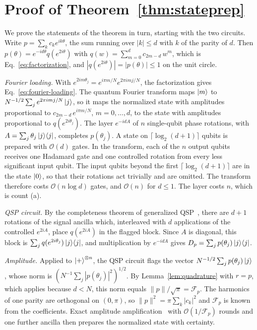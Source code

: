 \section{Proof of Theorem~\ref{thm:stateprep}}
\label{app:filling}
\label{app:stateprep}

We prove the statements of the theorem in turn, starting with the
two circuits.  Write $p=\sum_k c_k e^{ik\theta}$, the sum running
over $|k|\le d$ with $k$ of the parity of $d$.  Then
$p(\theta)=e^{-id\theta}q(e^{2i\theta})$ with
$q(w)=\sum_{m=0}^{d}c_{2m-d}\,w^m$, which is
Eq.~\eqref{eq:factorization}, and
$|q(e^{2i\theta})|=|p(\theta)|\le1$ on the unit circle.

\emph{Fourier loading.}  With
$e^{2im\theta_j}=e^{i\pi m/N}e^{2\pi imj/N}$, the
factorization gives Eq.~\eqref{eq:fourier-loading}.  The quantum
Fourier transform maps $\ket{m}$ to
$N^{-1/2}\sum_je^{2\pi imj/N}\ket{j}$, so it maps the normalized
state with amplitudes proportional to $c_{2m-d}\,e^{i\pi m/N}$,
$m=0,\dots,d$, to the state with amplitudes proportional to
$q(e^{2i\theta_j})$.  The layer $e^{-idA}$ of $n$ single-qubit
phase rotations, with $A=\sum_j\theta_j\ket{j}\!\bra{j}$, completes
$p(\theta_j)$.  A state on $\lceil\log_2(d+1)\rceil$ qubits is
prepared with $\mathcal{O}(d)$ gates.  In the transform, each of
the $n$ output qubits receives one Hadamard gate and one
controlled rotation from every less significant input qubit.  The
input qubits beyond the first $\lceil\log_2(d+1)\rceil$ are in
the state $\ket{0}$, so that their rotations act trivially and
are omitted.  The transform therefore costs
$\mathcal{O}(n\log d)$ gates, and $\mathcal{O}(n)$ for $d\le1$.
The layer costs $n$, which is count (a).

\emph{QSP circuit.}  By the
completeness theorem of generalized
QSP~\cite[Cor.~5]{MotlaghWiebe2023}, there are $d+1$ rotations of the
signal ancilla which, interleaved with $d$ applications of the
controlled $e^{2iA}$, place $q(e^{2iA})$ in the flagged block.
Since $A$ is diagonal, this block is
$\sum_j q(e^{2i\theta_j})\ket{j}\!\bra{j}$, and multiplication by
$e^{-idA}$ gives
$D_p=\sum_j p(\theta_j)\ket{j}\!\bra{j}$.

\emph{Amplitude.}  Applied to $\ket{+}^{\otimes n}$, the QSP circuit
flags the vector $N^{-1/2}\sum_j p(\theta_j)\ket{j}$, whose norm is
$(N^{-1}\sum_j|p(\theta_j)|^2)^{1/2}$.  By
Lemma~\ref{lem:quadrature} with $r=p$, which applies because
$d<N$, this norm equals $\|p\|/\sqrt\pi=\mathcal{F}_p$.  The
harmonics of one parity are orthogonal on $(0,\pi)$, so
$\|p\|^2=\pi\sum_k|c_k|^2$ and $\mathcal{F}_p$ is known from the
coefficients.  Exact amplitude
amplification~\cite{BrassardHoyerMoscaTapp2002,McArdleGilyenBerta2025}
with $\mathcal{O}(1/\mathcal{F}_p)$ rounds and one further ancilla
then prepares the normalized state with certainty.

